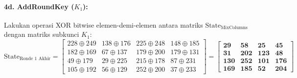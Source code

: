 \documentclass[11pt,a4paper]{article}
\begin{document}
\paragraph{4d. AddRoundKey ($K_1$):}
Lakukan operasi XOR bitwise elemen-demi-elemen antara matriks $\text{State}_{\text{MixColumns}}$ dengan matriks subkunci $K_1$:
\begin{equation*}
\text{State}_{\text{Ronde 1 Akhir}} = \begin{bmatrix}
228 \oplus 249 & 138 \oplus 176 & 225 \oplus 248 & 148 \oplus 185 \\
182 \oplus 169 & 67 \oplus 137  & 179 \oplus 200 & 179 \oplus 131 \\
49 \oplus 179  & 29 \oplus 225  & 215 \oplus 178 & 87 \oplus 231 \\
105 \oplus 192 & 56 \oplus 129  & 252 \oplus 200 & 37 \oplus 233
\end{bmatrix}
= \mathbf{\begin{bmatrix}
29  & 58  & 25  & 45 \\
31  & 202 & 123 & 48 \\
130 & 252 & 101 & 176 \\
169 & 185 & 52  & 204
\end{bmatrix}}
\end{equation*}
\end{document}
